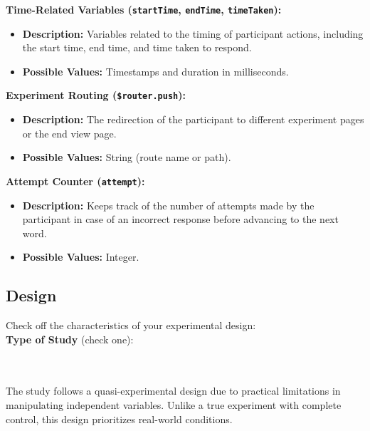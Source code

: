 \documentclass{article}
\begin{document}
\begin{tcolorbox}[title=Blocking Variables]

\textbf{Time-Related Variables (\texttt{startTime}, \texttt{endTime}, \texttt{timeTaken}):}
\begin{itemize}
    \item \textbf{Description:} Variables related to the timing of participant actions, including the start time, end time, and time taken to respond.
    \item \textbf{Possible Values:} Timestamps and duration in milliseconds.
\end{itemize}

\textbf{Experiment Routing (\texttt{\$router.push}):}
\begin{itemize}
    \item \textbf{Description:} The redirection of the participant to different experiment pages or the end view page.
    \item \textbf{Possible Values:} String (route name or path).
\end{itemize}

\textbf{Attempt Counter (\texttt{attempt}):}
\begin{itemize}
    \item \textbf{Description:} Keeps track of the number of attempts made by the participant in case of an incorrect response before advancing to the next word.
    \item \textbf{Possible Values:} Integer.
\end{itemize}

\end{tcolorbox}

\subsection{Design}
Check off the characteristics of your experimental design:\\

\textbf{Type of Study} (check one):\\
\noindent
\begin{minipage}{0.4\textwidth}
\end{minipage}%
\begin{minipage}{0.4\textwidth}
\end{minipage}%
\begin{minipage}{0.2\textwidth}
\end{minipage}\\\\
The study follows a quasi-experimental design due to practical limitations in manipulating independent variables. Unlike a true experiment with complete control, this design prioritizes real-world conditions.
\end{document}
